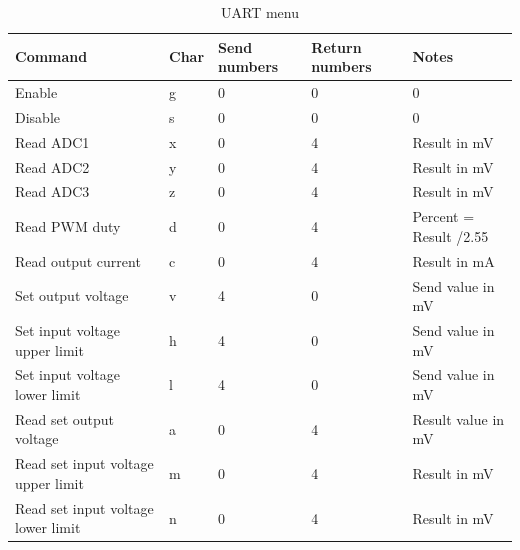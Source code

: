 \documentclass[12pt]{article}%
\begin{document}
\begin{table}[H]
   \centering
   \caption{UART menu}
   \label{tab:menu}
   \begin{tabular}{|p{4cm}|p{1.2cm}|p{1.8cm}|p{1.8cm}|p{5cm}|}
   \hline
      \textbf{Command}              & \textbf{Char}   &  \textbf{Send numbers}   &  \textbf{Return numbers}  &  \textbf{Notes}\\ \hline
      Enable                        & g               &  0                       &  0                        &  0                        \\ \hline
      Disable                       & s               &  0                       &  0                        &  0                        \\ \hline
      Read ADC1                     & x               &  0                       &  4                        &  Result in mV                         \\ \hline
      Read ADC2                     & y               &  0                       &  4                        &  Result in mV                         \\ \hline
      Read ADC3                     & z               &  0                       &  4                        &  Result in mV                         \\ \hline
      Read PWM duty                    & d               &  0                       &  4                        &  Percent = Result /2.55                         \\ \hline
      Read output current           & c               &  0                       &  4                        &  Result in mA              \\ \hline
      Set output voltage            & v               &  4                       &  0                        &  Send value in mV         \\ \hline
      Set input voltage upper limit & h               &  4                       &  0                        &  Send value in mV             \\ \hline
      Set input voltage lower limit & l               &  4                       &  0                        &  Send value in mV         \\ \hline
      Read set output voltage            & a               &  0                      &  4                       &  Result value in mV         \\ \hline
      Read set input voltage upper limit & m               &  0                       &  4                        &  Result in mV             \\ \hline
      Read set input voltage lower limit & n              &  0                       &  4                        &  Result in mV         \\ \hline
   \end{tabular}
\end{table}
\end{document}
